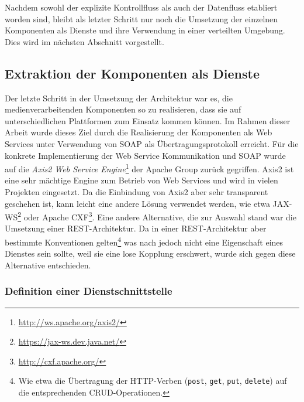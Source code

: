   Nachdem sowohl der explizite Kontrollfluss als auch der Datenfluss etabliert worden sind, bleibt als letzter Schritt nur noch die Umsetzung der einzelnen Komponenten als Dienste und ihre Verwendung in einer verteilten Umgebung. Dies wird im nächsten Abschnitt vorgestellt.
  

\subsection{Extraktion der Komponenten als Dienste} %
\label{sub:extraktion_der_komponenten_als_dienste}

  Der letzte Schritt in der Umsetzung der Architektur war es, die medienverarbeitenden Komponenten so zu realisieren, dass sie auf unterschiedlichen Plattformen zum Einsatz kommen können. Im Rahmen dieser Arbeit wurde dieses Ziel durch die Realisierung der Komponenten als Web Services unter Verwendung von SOAP als Übertragungsprotokoll erreicht. Für die konkrete Implementierung der Web Service Kommunikation und SOAP wurde auf die \emph{Axis2 Web Service Engine}\footnote{\url{http://ws.apache.org/axis2/}} der Apache Group zurück gegriffen. Axis2 ist eine sehr mächtige Engine zum Betrieb von Web Services und wird in vielen Projekten eingesetzt. Da die Einbindung von Axis2 aber sehr transparent geschehen ist, kann leicht eine andere Lösung verwendet werden, wie etwa JAX-WS\footnote{\url{https://jax-ws.dev.java.net/}} oder Apache CXF\footnote{\url{http://cxf.apache.org/}}. Eine andere Alternative, die zur Auswahl stand war die Umsetzung einer REST-Architektur. Da in einer REST-Architektur aber bestimmte Konventionen gelten\footnote{Wie etwa die Übertragung der HTTP-Verben (\lstinline[basicstyle=\ttfamily\footnotesize]{post}, \lstinline[basicstyle=\ttfamily\footnotesize]{get}, \lstinline[basicstyle=\ttfamily\footnotesize]{put}, \lstinline[basicstyle=\ttfamily\footnotesize]{delete}) auf die entsprechenden CRUD-Operationen.} was nach \citep{service_oriented_computing} jedoch nicht eine Eigenschaft eines Dienstes sein sollte, weil sie eine lose Kopplung erschwert, wurde sich gegen diese Alternative entschieden.
  
\subsubsection{Definition einer Dienstschnittstelle} %
\label{ssub:definition_einer_dienstschnittstelle}

